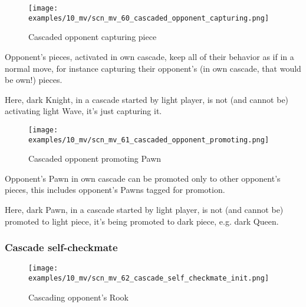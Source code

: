 
\clearpage %

\vspace*{-2.1\baselineskip}
\noindent
\begin{figure}[h]
\texttt{[image: examples/10\_mv/scn\_mv\_60\_cascaded\_opponent\_capturing.png]}
\caption{Cascaded opponent capturing piece}
\label{fig:scn_mv_60_cascaded_opponent_capturing}
\end{figure}

Opponent's pieces, activated in own cascade, keep all of their behavior as if in a
normal move, for instance capturing their opponent's (in own cascade, that would be
own!) pieces.

Here, dark Knight, in a cascade started by light player, is not (and cannot be)
activating light Wave, it's just capturing it.

\clearpage %

\vspace*{-2.1\baselineskip}
\noindent
\begin{figure}[h]
\texttt{[image: examples/10\_mv/scn\_mv\_61\_cascaded\_opponent\_promoting.png]}
\caption{Cascaded opponent promoting Pawn}
\label{fig:scn_mv_61_cascaded_opponent_promoting}
\end{figure}

Opponent's Pawn in own cascade can be promoted only to other opponent's pieces,
this includes opponent's Pawns tagged for promotion.

Here, dark Pawn, in a cascade started by light player, is not (and cannot be)
promoted to light piece, it's being promoted to dark piece, e.g. dark Queen.

\clearpage %

\subsubsection*{Cascade self-checkmate}
\label{sec:Miranda's veil/Wave/Cascading opponent/Cascade self-checkmate}

\vspace*{-1.5\baselineskip}
\noindent
\begin{figure}[h]
\texttt{[image: examples/10\_mv/scn\_mv\_62\_cascade\_self\_checkmate\_init.png]}
\vspace*{-1.4\baselineskip}
\caption{Cascading opponent's Rook}
\label{fig:scn_mv_62_cascade_self_checkmate_init}
\end{figure}

